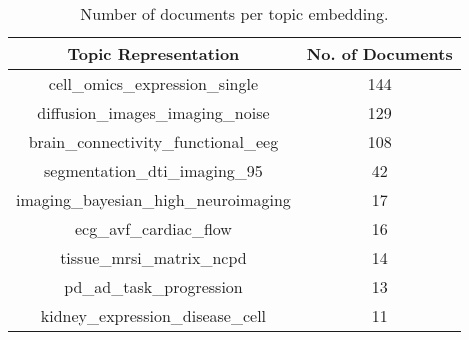 \begin{table}[h!]
\centering
 \begin{tabular}{||c | c||} 
 \hline
 \textbf{Topic Representation} & \textbf{No. of Documents} \\ 
 \hline\hline
cell\_omics\_expression\_single & 144 \\
\hline
diffusion\_images\_imaging\_noise & 129 \\
\hline
brain\_connectivity\_functional\_eeg	& 108 \\
\hline
segmentation\_dti\_imaging\_95 & 42 \\
\hline
imaging\_bayesian\_high\_neuroimaging & 17 \\
\hline
ecg\_avf\_cardiac\_flow	& 16 \\
\hline
tissue\_mrsi\_matrix\_ncpd & 14 \\
\hline
pd\_ad\_task\_progression & 13 \\
\hline
kidney\_expression\_disease\_cell & 11 \\
 \hline
 \end{tabular}
 \caption{Number of documents per topic embedding.}
\end{table}
